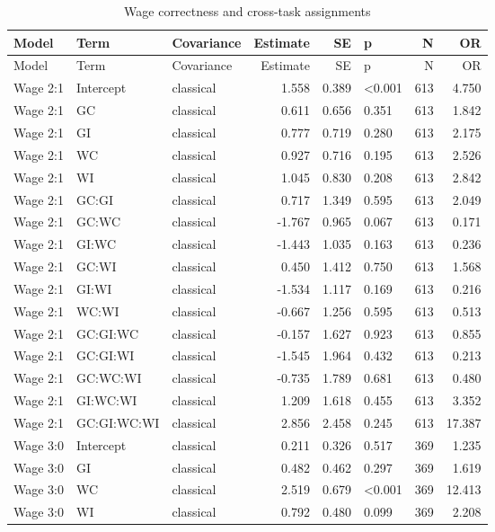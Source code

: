 
\begin{longtable}[t]{lllrrlrr}
\caption{\label{tab:spillover}Wage correctness and cross-task assignments}\\
\toprule
Model & Term & Covariance & Estimate & SE & p & N & OR\\
\midrule
\endfirsthead
\toprule
Model & Term & Covariance & Estimate & SE & p & N & OR\\
\midrule
\endhead
Wage 2:1 & Intercept & classical & 1.558 & 0.389 & <0.001 & 613 & 4.750\\
Wage 2:1 & GC & classical & 0.611 & 0.656 & 0.351 & 613 & 1.842\\
Wage 2:1 & GI & classical & 0.777 & 0.719 & 0.280 & 613 & 2.175\\
Wage 2:1 & WC & classical & 0.927 & 0.716 & 0.195 & 613 & 2.526\\
Wage 2:1 & WI & classical & 1.045 & 0.830 & 0.208 & 613 & 2.842\\
Wage 2:1 & GC:GI & classical & 0.717 & 1.349 & 0.595 & 613 & 2.049\\
Wage 2:1 & GC:WC & classical & -1.767 & 0.965 & 0.067 & 613 & 0.171\\
Wage 2:1 & GI:WC & classical & -1.443 & 1.035 & 0.163 & 613 & 0.236\\
Wage 2:1 & GC:WI & classical & 0.450 & 1.412 & 0.750 & 613 & 1.568\\
Wage 2:1 & GI:WI & classical & -1.534 & 1.117 & 0.169 & 613 & 0.216\\
Wage 2:1 & WC:WI & classical & -0.667 & 1.256 & 0.595 & 613 & 0.513\\
Wage 2:1 & GC:GI:WC & classical & -0.157 & 1.627 & 0.923 & 613 & 0.855\\
Wage 2:1 & GC:GI:WI & classical & -1.545 & 1.964 & 0.432 & 613 & 0.213\\
Wage 2:1 & GC:WC:WI & classical & -0.735 & 1.789 & 0.681 & 613 & 0.480\\
Wage 2:1 & GI:WC:WI & classical & 1.209 & 1.618 & 0.455 & 613 & 3.352\\
Wage 2:1 & GC:GI:WC:WI & classical & 2.856 & 2.458 & 0.245 & 613 & 17.387\\
Wage 3:0 & Intercept & classical & 0.211 & 0.326 & 0.517 & 369 & 1.235\\
Wage 3:0 & GI & classical & 0.482 & 0.462 & 0.297 & 369 & 1.619\\
Wage 3:0 & WC & classical & 2.519 & 0.679 & <0.001 & 369 & 12.413\\
Wage 3:0 & WI & classical & 0.792 & 0.480 & 0.099 & 369 & 2.208\\

\end{longtable}
